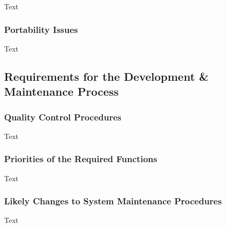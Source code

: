 \documentclass[12pt]{article}
\begin{document}
Text

\subsubsection {Portability Issues}

Text

\subsection{Requirements for the Development & Maintenance Process}

\subsubsection {Quality Control Procedures}

Text

\subsubsection {Priorities of the Required Functions}

Text

\subsubsection {Likely Changes to System Maintenance Procedures}

Text
\end{document}
